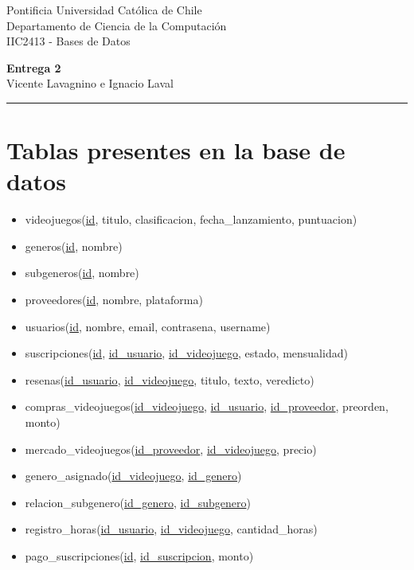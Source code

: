 \documentclass[12pt]{article}
\begin{document}
\thispagestyle{empty}
\noindent Pontificia Universidad Católica de Chile\\
\noindent Departamento de Ciencia de la Computación\\
\noindent IIC2413 - Bases de Datos\\
\begin{center}
{\Huge\bf Entrega 2}\\
\vspace{1em}
\footnotesize{Vicente Lavagnino e Ignacio Laval}\\
\vspace{1em}
\rule{\textwidth}{0.1mm}
\end{center}
\thispagestyle{plain}

\section{Tablas presentes en la base de datos}

\begin{itemize}
    \item videojuegos(\underline{id}, titulo, clasificacion, fecha\_lanzamiento, puntuacion)

\item generos(\underline{id}, nombre)

\item subgeneros(\underline{id}, nombre)

\item proveedores(\underline{id}, nombre, plataforma)

\item usuarios(\underline{id}, nombre, email, contrasena, username)

\item suscripciones(\underline{id}, \underline{id\_usuario}, \underline{id\_videojuego}, estado, mensualidad)

\item resenas(\underline{id\_usuario}, \underline{id\_videojuego}, titulo, texto, veredicto)

\item compras\_videojuegos(\underline{id\_videojuego}, \underline{id\_usuario}, \underline{id\_proveedor}, preorden, monto)

\item mercado\_videojuegos(\underline{id\_proveedor}, \underline{id\_videojuego}, precio)

\item genero\_asignado(\underline{id\_videojuego}, \underline{id\_genero})

\item relacion\_subgenero(\underline{id\_genero}, \underline{id\_subgenero})

\item registro\_horas(\underline{id\_usuario}, \underline{id\_videojuego}, cantidad\_horas)

\item pago\_suscripciones(\underline{id}, \underline{id\_suscripcion}, monto)

\end{itemize}
\end{document}
